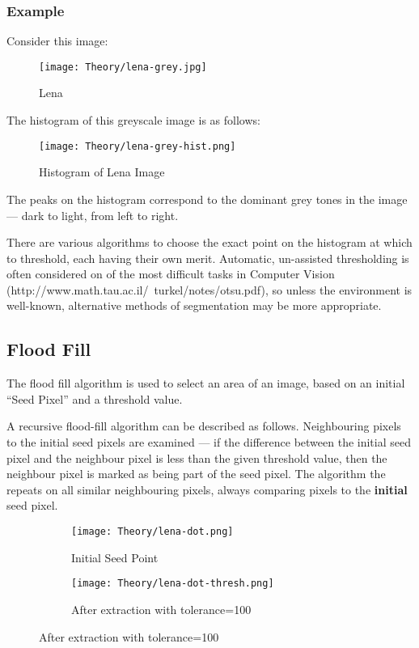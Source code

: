 \subsubsection{Example}
Consider this image:

\begin{figure}
    \centering
    \texttt{[image: Theory/lena-grey.jpg]}
    \caption{Lena}
\end{figure}

The histogram of this greyscale image is as follows:

\begin{figure}[H]
    \centering
    \texttt{[image: Theory/lena-grey-hist.png]}
    \caption{Histogram of Lena Image}
\end{figure}

The peaks on the histogram correspond to the dominant grey tones in the image --- dark to light, from left to right.

There are various algorithms to choose the exact point on the histogram at which to threshold, each having their own merit. Automatic, un-assisted thresholding is often considered on of the most difficult tasks in Computer Vision (http://www.math.tau.ac.il/~turkel/notes/otsu.pdf), so unless the environment is well-known, alternative methods of segmentation may be more appropriate.

\subsection{Flood Fill}
\label{sec:floodfill}
The flood fill algorithm is used to select an area of an image, based on an initial ``Seed Pixel'' and a threshold value.

A recursive flood-fill algorithm can be described as follows. Neighbouring pixels to the initial seed pixels are examined --- if the difference between the initial seed pixel and the neighbour pixel is less than the given threshold value, then the neighbour pixel is marked as being part of the seed pixel. The algorithm the repeats on all similar neighbouring pixels, always comparing pixels to the \textbf{initial} seed pixel.

\begin{figure}[H]
    \centering
    \begin{subfigure}[b]{0.45\textwidth}
        \centering
        \texttt{[image: Theory/lena-dot.png]}
        \caption{Initial Seed Point}
    \end{subfigure}
    \begin{subfigure}[b]{0.45\textwidth}
        \centering
        \texttt{[image: Theory/lena-dot-thresh.png]}
        \caption{After extraction with tolerance=100}
    \end{subfigure}
\end{figure}

